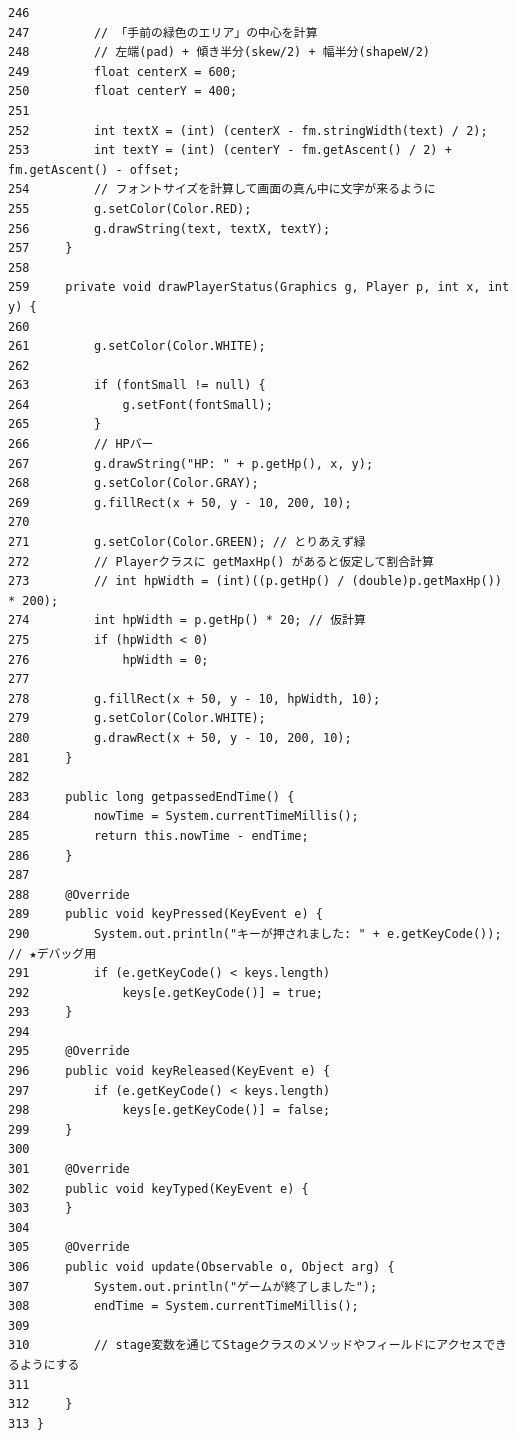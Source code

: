 \documentclass[11pt,a4j]{jarticle}
\begin{document}
\begin{small}
\begin{verbatim}
246 
247         // 「手前の緑色のエリア」の中心を計算
248         // 左端(pad) + 傾き半分(skew/2) + 幅半分(shapeW/2)
249         float centerX = 600;
250         float centerY = 400;
251 
252         int textX = (int) (centerX - fm.stringWidth(text) / 2);
253         int textY = (int) (centerY - fm.getAscent() / 2) + fm.getAscent() - offset;
254         // フォントサイズを計算して画面の真ん中に文字が来るように
255         g.setColor(Color.RED);
256         g.drawString(text, textX, textY);
257     }
258 
259     private void drawPlayerStatus(Graphics g, Player p, int x, int y) {
260 
261         g.setColor(Color.WHITE);
262 
263         if (fontSmall != null) {
264             g.setFont(fontSmall);
265         }
266         // HPバー
267         g.drawString("HP: " + p.getHp(), x, y);
268         g.setColor(Color.GRAY);
269         g.fillRect(x + 50, y - 10, 200, 10);
270 
271         g.setColor(Color.GREEN); // とりあえず緑
272         // Playerクラスに getMaxHp() があると仮定して割合計算
273         // int hpWidth = (int)((p.getHp() / (double)p.getMaxHp()) * 200);
274         int hpWidth = p.getHp() * 20; // 仮計算
275         if (hpWidth < 0)
276             hpWidth = 0;
277 
278         g.fillRect(x + 50, y - 10, hpWidth, 10);
279         g.setColor(Color.WHITE);
280         g.drawRect(x + 50, y - 10, 200, 10);
281     }
282 
283     public long getpassedEndTime() {
284         nowTime = System.currentTimeMillis();
285         return this.nowTime - endTime;
286     }
287 
288     @Override
289     public void keyPressed(KeyEvent e) {
290         System.out.println("キーが押されました: " + e.getKeyCode()); // ★デバッグ用
291         if (e.getKeyCode() < keys.length)
292             keys[e.getKeyCode()] = true;
293     }
294 
295     @Override
296     public void keyReleased(KeyEvent e) {
297         if (e.getKeyCode() < keys.length)
298             keys[e.getKeyCode()] = false;
299     }
300 
301     @Override
302     public void keyTyped(KeyEvent e) {
303     }
304 
305     @Override
306     public void update(Observable o, Object arg) {
307         System.out.println("ゲームが終了しました");
308         endTime = System.currentTimeMillis();
309 
310         // stage変数を通じてStageクラスのメソッドやフィールドにアクセスできるようにする
311 
312     }
313 }
\end{verbatim}
\end{small}
\end{document}
